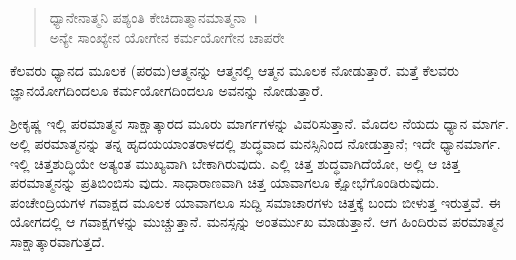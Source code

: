 \begin{verse}
ಧ್ಯಾನೇನಾತ್ಮನಿ ಪಶ್ಯಂತಿ ಕೇಚಿದಾತ್ಮಾನಮಾತ್ಮನಾ~।\\ಅನ್ಯೇ ಸಾಂಖ್ಯೇನ ಯೋಗೇನ ಕರ್ಮಯೋಗೇನ ಚಾಪರೇ 
\end{verse}

{\small ಕೆಲವರು ಧ್ಯಾನದ ಮೂಲಕ (ಪರಮ)ಆತ್ಮನನ್ನು ಆತ್ಮನಲ್ಲಿ ಆತ್ಮನ ಮೂಲಕ ನೋಡುತ್ತಾರೆ. ಮತ್ತೆ ಕೆಲವರು ಜ್ಞಾನಯೋಗದಿಂದಲೂ ಕರ್ಮಯೋಗದಿಂದಲೂ ಅವನನ್ನು ನೋಡುತ್ತಾರೆ.}

ಶ‍್ರೀಕೃಷ್ಣ ಇಲ್ಲಿ ಪರಮಾತ್ಮನ ಸಾಕ್ಷಾತ್ಕಾರದ ಮೂರು ಮಾರ್ಗಗಳನ್ನು ವಿವರಿಸುತ್ತಾನೆ. ಮೊದಲ ನೆಯದು ಧ್ಯಾನ ಮಾರ್ಗ. ಅಲ್ಲಿ ಪರಮಾತ್ಮನನ್ನು ತನ್ನ ಹೃದಯಯಾಂತರಾಳದಲ್ಲಿ ಶುದ್ಧವಾದ ಮನಸ್ಸಿನಿಂದ ನೋಡುತ್ತಾನೆ; ಇದೇ ಧ್ಯಾನಮಾರ್ಗ. ಇಲ್ಲಿ ಚಿತ್ತಶುದ್ಧಿಯೇ ಅತ್ಯಂತ ಮುಖ್ಯವಾಗಿ ಬೇಕಾಗಿರುವುದು. ಎಲ್ಲಿ ಚಿತ್ತ ಶುದ್ಧವಾಗಿದೆಯೋ, ಅಲ್ಲಿ ಆ ಚಿತ್ತ ಪರಮಾತ್ಮನನ್ನು ಪ್ರತಿಬಿಂಬಿಸು ವುದು. ಸಾಧಾರಾಣವಾಗಿ ಚಿತ್ತ ಯಾವಾಗಲೂ ಕ್ಷೋಭೆಗೊಂಡಿರುವುದು. ಪಂಚೇಂದ್ರಿಯಗಳ ಗವಾಕ್ಷದ ಮೂಲಕ ಯಾವಾಗಲೂ ಸುದ್ದಿ ಸಮಾಚಾರಗಳು ಚಿತ್ತಕ್ಕೆ ಬಂದು ಬೀಳುತ್ತ ಇರುತ್ತವೆ. ಈ ಯೋಗದಲ್ಲಿ ಆ ಗವಾಕ್ಷಗಳನ್ನು ಮುಚ್ಚುತ್ತಾನೆ. ಮನಸ್ಸನ್ನು ಅಂತರ್ಮುಖ ಮಾಡುತ್ತಾನೆ. ಆಗ ಹಿಂದಿರುವ ಪರಮಾತ್ಮನ ಸಾಕ್ಷಾತ್ಕಾರವಾಗುತ್ತದೆ.

